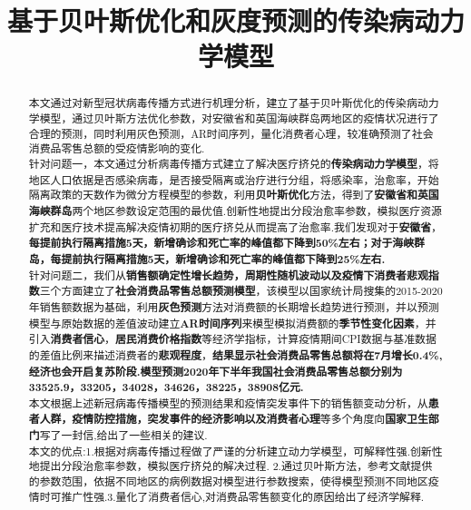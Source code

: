 \documentclass{whutmod}
\title{基于贝叶斯优化和灰度预测的传染病动力学模型}
\begin{document}
\maketitle
\begin{abstract}
	本文通过对新型冠状病毒传播方式进行机理分析，建立了基于贝叶斯优化的传染病动力学模型，通过贝叶斯方法优化参数，对安徽省和英国海峡群岛两地区的疫情状况进行了合理的预测，同时利用灰色预测，AR时间序列，量化消费者心理，较准确预测了社会消费品零售总额的受疫情影响的变化.
	~\\
	
	针对问题一，本文通过分析病毒传播方式建立了解决医疗挤兑的\textbf{传染病动力学模型}，将地区人口依据是否感染病毒，是否接受隔离或治疗进行分组，将感染率，治愈率，开始隔离政策的天数作为微分方程模型的参数，利用\textbf{贝叶斯优化}方法，得到了\textbf{安徽省和英国海峡群岛}两个地区参数设定范围的最优值.创新性地提出分段治愈率参数，模拟医疗资源扩充和医疗技术提高解决疫情初期的医疗挤兑从而提高了治愈率.我们发现对于\textbf{安徽省}，\textbf{每提前执行隔离措施5天，新增确诊和死亡率的峰值都下降到50\%左右；对于海峡群岛，每提前执行隔离措施5天，新增确诊和死亡率的峰值都下降到25\%左右.}
	~\\
	
	针对问题二，我们从\textbf{销售额确定性增长趋势，周期性随机波动以及疫情下消费者悲观指数}三个方面建立了\textbf{社会消费品零售总额预测模型}，该模型以国家统计局搜集的2015-2020年销售额数据为基础，利用\textbf{灰色预测}方法对消费额的长期增长趋势进行预测，并以预测模型与原始数据的差值波动建立\textbf{AR时间序列}来模型模拟消费额的\textbf{季节性变化因素}，并引入\textbf{消费者信心}，\textbf{居民消费价格指数}等经济学指标，计算疫情期间CPI数据与基准数据的差值比例来描述消费者的\textbf{悲观程度}，\textbf{结果显示社会消费品零售总额将在7月增长0.4\%,经济也会开启复苏阶段.模型预测2020年下半年我国社会消费品零售总额分别为33525.9，33205，34028，34626，38225，38908亿元.}
	 	~\\
	 	
	本文根据上述新冠病毒传播模型的预测结果和疫情突发事件下的销售额变动分析，从\textbf{患者人群，疫情防控措施，突发事件的经济影响以及消费者心理}等多个角度向\textbf{国家卫生部门}写了一封信,给出了一些相关的建议.
	 	~\\
	 	
	本文的优点:1.根据对病毒传播过程做了严谨的分析建立动力学模型，可解释性强.创新性地提出分段治愈率参数，模拟医疗挤兑的解决过程. \quad 2.通过贝叶斯方法，参考文献提供的参数范围，依据不同地区的病例数据对模型进行参数搜索，使得模型预测不同地区疫情时可推广性强.\quad 3.量化了消费者信心,对消费品零售额变化的原因给出了经济学解释.
	
	\end{abstract}
	
\end{document}
